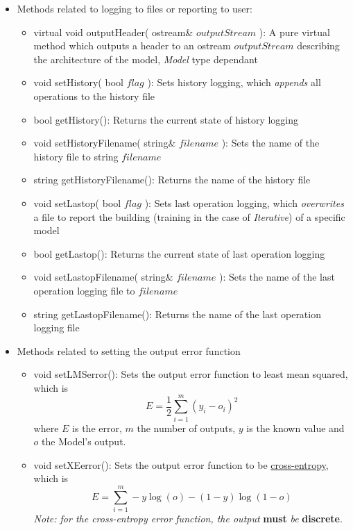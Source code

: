 \documentclass{report}
\def\beginred{\color{red}}
\def\endcolor{\color{black}}
\begin{document}
\begin{itemize}
\begin{itemize}
\item Methods related to logging to files or reporting to user:
\begin{itemize}
\item \beginred virtual void outputHeader( ostream\& $outputStream$ ):
      A pure virtual method which outputs a header to an ostream
      $outputStream$ describing the architecture of the model, {\em
      Model} type dependant \endcolor
\item void setHistory( bool $flag$ ): Sets history logging, which {\em
      appends} all operations to the history file
\item bool getHistory(): Returns the current state of history logging
\item void setHistoryFilename( string\& $filename$ ): Sets the name of
      the history file to string $filename$
\item string getHistoryFilename(): Returns the name of the history
      file
\item void setLastop( bool $flag$ ): Sets last operation logging,
      which {\em overwrites} a file to report the building (training
      in the case of {\em Iterative}) of a specific model
\item bool getLastop(): Returns the current state of last operation
      logging
\item void setLastopFilename( string\& $filename$ ): Sets the name of
      the last operation logging file to $filename$
\item string getLastopFilename(): Returns the name of the last
      operation logging file
\end{itemize}

\item Methods related to setting the output error function
\begin{itemize}
\item void setLMSerror(): Sets the output error function to least mean
      squared, which is 
\begin{equation}
E = \frac{1}{2} \sum_{i=1}^{m} (y_i - o_i)^2
\end{equation}
where $E$ is the error, $m$ the number of outputs, $y$ is the known
value and $o$ the Model's output.
\item void setXEerror(): Sets the output error function to be
      \hyperref[xentropyfunk]{cross-entropy},
       which is
\begin{equation}
E = \sum_{i=1}^{m} -y\log(o)-(1-y)\log(1-o)
\end{equation}
{\em Note: for the cross-entropy error function, the output } {\bf
must} {\em be } {\bf discrete}.
\end{itemize}


\end{itemize}
\end{itemize}
\end{document}
